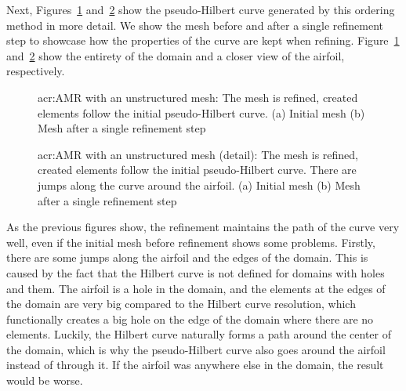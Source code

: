 Next, Figures~\ref{fig:mesh_P0_adaptivity_far} and~\ref{fig:mesh_P0_adaptivity_near} show the
pseudo-Hilbert curve generated by this ordering method in more detail. We show the mesh before and
after a single refinement step to showcase how the properties of the curve are kept when refining.
Figure~\ref{fig:mesh_P0_adaptivity_far} and~\ref{fig:mesh_P0_adaptivity_near} show the entirety of
the domain and a closer view of the airfoil, respectively.

\begin{figure}[H]
	\centering
	\caption{\Acrlong{acr:AMR} with an unstructured mesh: The mesh is refined, created elements follow the initial pseudo-Hilbert curve. (a) Initial mesh (b) Mesh after a single refinement step}\label{fig:mesh_P0_adaptivity_far}
\end{figure}

\begin{figure}[H]
	\centering
	\caption{\Acrlong{acr:AMR} with an unstructured mesh (detail): The mesh is refined, created elements follow the initial pseudo-Hilbert curve. There are jumps along the curve around the airfoil. (a) Initial mesh (b) Mesh after a single refinement step}\label{fig:mesh_P0_adaptivity_near}
\end{figure}

As the previous figures show, the refinement maintains the path of the curve very well, even if the
initial mesh before refinement shows some problems. Firstly, there are some jumps along the airfoil
and the edges of the domain. This is caused by the fact that the Hilbert curve is not defined for
domains with holes and them. The airfoil is a hole in the domain, and the elements at the edges of
the domain are very big compared to the Hilbert curve resolution, which functionally creates a big
hole on the edge of the domain where there are no elements. Luckily, the Hilbert curve naturally
forms a path around the center of the domain, which is why the pseudo-Hilbert curve also goes around
the airfoil instead of through it. If the airfoil was anywhere else in the domain, the result would
be worse.

